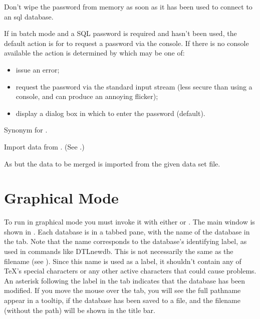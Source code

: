 Don't wipe the password from memory as soon as it 
has been used to connect to an \gls{sql} database.

If in batch mode and a SQL password is required
and  hasn't been used, the
default action is for  to request a password
via the console. If there is no console available
the action is determined by 
which may be one of:
\begin{itemize}
  \item {} issue an error;
  \item {} request the password via the standard
  input stream (less secure than using a console, and can produce 
  an annoying flicker);
  \item {} display a dialog box in which to enter the password (default).
\end{itemize}

Synonym for .

Import  data from .
(See .)

As  but the data to be merged is imported from the
given  data set file.

\chapter{Graphical Mode}\label{sec:gui}

To run  in graphical mode you must invoke it with either 
 or . The main window
is shown in . Each database is
in a tabbed pane, with the name of the database in the
tab. Note that the name corresponds to the database's identifying
label, as used in commands like \gls{DTLnewdb}. This is 
not necessarily the same as the filename (see ). 
Since this name is used as a label, it shouldn't contain any of 
\TeX's special characters or any other active characters that could 
cause problems.  An asterisk \code{*} following the label in the tab 
indicates that the database has been modified. If you move the mouse
over the tab, you will see the full pathname appear in a tooltip,
if the database has been saved to a  file,
and the filename (without the path) will be shown in the title bar.

